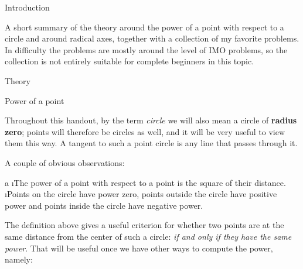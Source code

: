 

\let\angle\sphericalangle





\sec Introduction

A short summary of the theory around the power of a point with respect to a circle and around radical axes, together with a collection of my favorite problems. In difficulty the problems are mostly around the level of IMO problems, so the collection is not entirely suitable for complete beginners in this topic.

\sec Theory

\secc Power of a point

Throughout this handout, by the term \textit{circle} we will also mean a circle of \textbf{radius zero}; points will therefore be circles as well, and it will be very useful to view them this way. A tangent to such a point circle is any line that passes through it.


A couple of obvious observations:

\begitems \style a
\i The power of a point with respect to a point is the square of their distance.
\i Points on the circle have power zero, points outside the circle have positive power and points inside the circle have negative power.
\enditems

The definition above gives a useful criterion for whether two points are at the same distance from the center of such a circle: \textit{if and only if they have the same power}. That will be useful once we have other ways to compute the power, namely:


